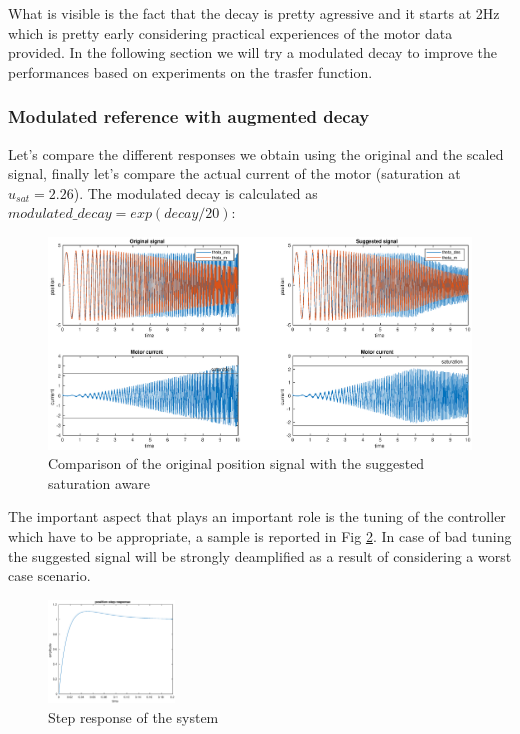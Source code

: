 \documentclass[a4paper,11pt]{article}
\begin{document}
What is visible is the fact that the decay is pretty agressive and it starts at 2Hz which is pretty early considering practical experiences of the motor data provided. In the following section we will try a modulated decay to improve the performances based on experiments on the trasfer function.

\newpage
\subsubsection{Modulated reference with augmented decay}
\noindent Let's compare the different responses we obtain using the original and the scaled signal, finally let's compare the actual current of the motor (saturation at $u_{sat} = 2.26$). The modulated decay is calculated as $modulated\_decay = exp(decay/20)$:

\begin{figure}[H]
\begin{center}
\hspace*{-5cm}
\includegraphics[width=1.6\textwidth]{images/position_tau.eps}
\end{center}
\caption{Comparison of the original position signal with the suggested saturation aware}
\label{fig:position_tau}
\end{figure}

\noindent The important aspect that plays an important role is the tuning of the controller which have to be appropriate, a sample is reported in Fig \ref{fig:position_step_response}. In case of bad tuning the suggested signal will be strongly deamplified as a result of considering a worst case scenario.

\begin{figure}[H]
\begin{center}
\includegraphics[width=0.3\textwidth]{images/position_step_resp.eps}
\end{center}
\caption{Step response of the system}
\label{fig:position_step_response}
\end{figure}
  
\end{document}

